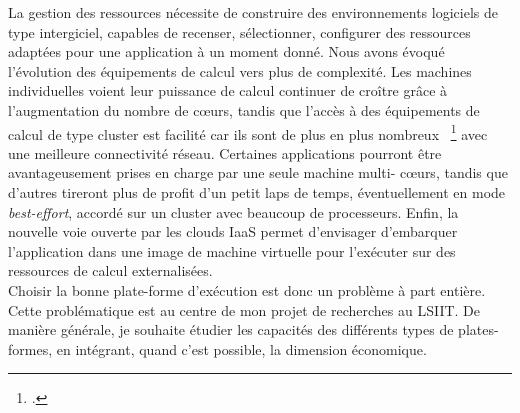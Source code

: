 \documentclass[11pt]{article}
\begin{document}
La gestion des ressources nécessite de construire des environnements logiciels 
de type intergiciel, capables de recenser, sélectionner, configurer des 
ressources adaptées pour une application à un moment donné. Nous avons évoqué 
l'évolution des équipements de calcul vers plus de complexité. Les machines 
individuelles voient leur puissance de calcul continuer de croître grâce à 
l'augmentation du nombre de c{\oe}urs, tandis que l'accès à des équipements 
de calcul de type cluster est facilité car ils sont de plus en plus nombreux~%
\footcite{Wu09} avec une  meilleure connectivité réseau. Certaines applications 
pourront être avantageusement prises en charge par une seule machine multi-%
c{\oe}urs, tandis que d'autres tireront plus de profit d'un petit laps de temps,  
éventuellement en mode \textit{best-effort}, accordé sur un cluster avec beaucoup 
de processeurs. Enfin, la nouvelle voie ouverte par les clouds IaaS permet 
d'envisager d'embarquer l'application  dans une image de machine virtuelle 
pour l'exécuter sur des ressources de calcul externalisées. \\

Choisir la bonne plate-forme d'exécution est donc un problème à part entière.
Cette problématique est au centre de mon projet de recherches au LSIIT. De 
manière générale, je souhaite étudier les capacités des différents types de 
plates-formes, en intégrant, quand c'est possible, la dimension économique.
\end{document}
